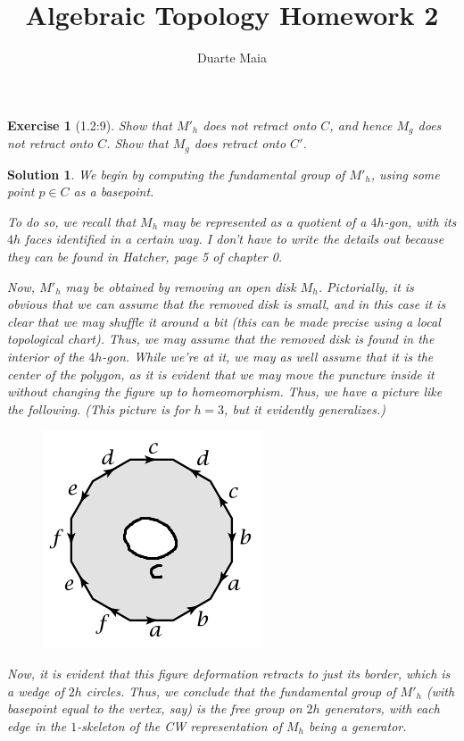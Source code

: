 \documentclass{article}
\title{Algebraic Topology Homework 2}
\author{Duarte Maia}
\theoremstyle{plain}
\newtheorem*{ex}{Exercise}
\theoremstyle{nonumberplain}
\newtheorem{sol}{Solution}
\begin{document}
\maketitle

\begin{ex}[1.2:9]
Show that $M'_h$ does not retract onto $C$, and hence $M_g$ does not retract onto $C$. Show that $M_g$ does retract onto $C'$.
\end{ex}

\begin{sol}
We begin by computing the fundamental group of $M'_h$, using some point $p \in C$ as a basepoint.

To do so, we recall that $M_h$ may be represented as a quotient of a $4h$-gon, with its $4h$ faces identified in a certain way. I don't have to write the details out because they can be found in Hatcher, page 5 of chapter 0.

Now, $M'_h$ may be obtained by removing an open disk $M_h$. Pictorially, it is obvious that we can assume that the removed disk is small, and in this case it is clear that we may shuffle it around a bit (this can be made precise using a local topological chart). Thus, we may assume that the removed disk is found in the interior of the $4h$-gon. While we're at it, we may as well assume that it is the center of the polygon, as it is evident that we may move the puncture inside it without changing the figure up to homeomorphism. Thus, we have a picture like the following. (This picture is for $h = 3$, but it evidently generalizes.)
\begin{figure}[H]
\centering
\includegraphics{mph1}
\end{figure}

Now, it is evident that this figure deformation retracts to just its border, which is a wedge of $2h$ circles. Thus, we conclude that the fundamental group of $M'_h$ (with basepoint equal to the vertex, say) is the free group on $2h$ generators, with each edge in the $1$-skeleton of the CW representation of $M_h$ being a generator.


\end{sol}
\end{document}
